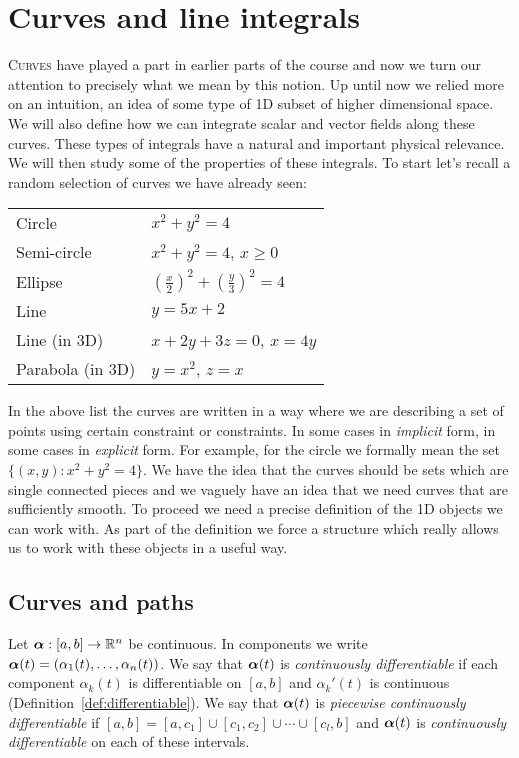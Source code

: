 \chapter{Curves and line integrals}

\lettrine{C}{urves} have played a part in earlier parts of the course and now we turn our attention to precisely what we mean by this notion.
Up until now we relied more on an intuition, an idea of some type of 1D subset of higher dimensional space.
We will also define how we can integrate scalar and vector fields along these curves.
These types of integrals have a natural and important physical relevance.
We will then study some of the properties of these integrals.
To start let's recall a random selection of curves we have already seen:

\begin{center}
    \begin{tabular}{l l}
        Circle           & \(x^2+y^2 = 4\)                               \\
        Semi-circle      & \(x^2+y^2 = 4\), \(x\geq 0\)                  \\
        Ellipse          & \({(\frac{x}{2})}^2 + {(\frac{y}{3})}^2 = 4\) \\
        Line             & \(y=5x+2\)                                    \\
        Line (in 3D)     & \(x+2y+3z=0\), \(x=4y\)                       \\
        Parabola (in 3D) & \(y=x^2\), \(z=x\)
    \end{tabular}
\end{center}

\noindent
In the above list the curves are written in a way where we are describing a set of points using certain constraint or constraints. In some cases in \emph{implicit} form, in some cases in \emph{explicit} form.
For example, for the circle we formally mean the set  \(\{(x,y):x^2+y^2 = 4\}\).
We have the idea that the curves should be sets which are single connected pieces and we vaguely have an idea that we need curves that are sufficiently smooth.
To proceed we need a precise definition of the 1D objects we can work with.
As part of the definition we force a structure which really allows us to work with these objects in a useful way.

\section{Curves and paths}
Let \(\boldsymbol{\alpha} : [a,b] \to \mathbb{R}^n\) be continuous.
In components we write \(\boldsymbol{\alpha}(t) = (\alpha_1(t),\ldots,\alpha_n(t))\).
We say that \(\boldsymbol{\alpha}(t)\) is \emph{continuously differentiable} if each component \(\alpha_k(t)\) is differentiable on \([a,b]\) and \(\alpha_k'(t)\) is continuous (Definition~\ref{def:differentiable}).
We say that \(\boldsymbol{\alpha}(t)\) is \emph{piecewise continuously differentiable} if \([a,b] = [a,c_1]\cup[c_1,c_2] \cup \cdots \cup [c_l,b]\) and \(\boldsymbol{\alpha}(t)\) is \emph{continuously differentiable} on each of these intervals.

